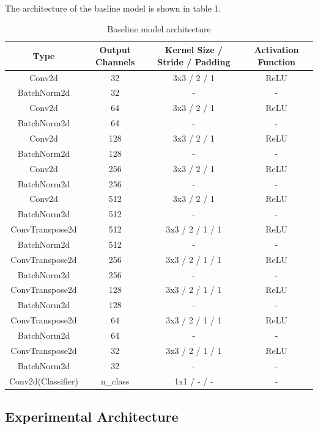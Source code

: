 \documentclass{article}
\begin{document}
The architecture of the basline model is shown in table 1.
\begin{table}[h!]
\caption{Baseline model architecture}
\label{tab:baseline_model_architecture}
\centering
\begin{tabular}{cccc}
  \toprule
  \textbf{Type} & \textbf{Output Channels} & \textbf{Kernel Size / Stride / Padding} & \textbf{Activation Function} \\ 
  \midrule
  Conv2d & 32 & 3x3 / 2 / 1 & ReLU \\ 
  BatchNorm2d & 32 & - & - \\ 
  Conv2d & 64 & 3x3 / 2 / 1 & ReLU \\ 
  BatchNorm2d & 64 & - & - \\ 
  Conv2d & 128 & 3x3 / 2 / 1 & ReLU \\ 
  BatchNorm2d & 128 & - & - \\ 
  Conv2d & 256 & 3x3 / 2 / 1 & ReLU \\ 
  BatchNorm2d & 256 & - & - \\ 
  Conv2d & 512 & 3x3 / 2 / 1 & ReLU \\ 
  BatchNorm2d & 512 & - & - \\ 
  ConvTranspose2d & 512 & 3x3 / 2 / 1 / 1 & ReLU \\ 
  BatchNorm2d & 512 & - & - \\ 
  ConvTranspose2d & 256 & 3x3 / 2 / 1 / 1 & ReLU \\ 
  BatchNorm2d & 256 & - & - \\ 
  ConvTranspose2d & 128 & 3x3 / 2 / 1 / 1 & ReLU \\ 
  BatchNorm2d & 128 & - & - \\ 
  ConvTranspose2d & 64 & 3x3 / 2 / 1 / 1 & ReLU \\ 
  BatchNorm2d & 64 & - & - \\ 
  ConvTranspose2d & 32 & 3x3 / 2 / 1 / 1 & ReLU \\ 
  BatchNorm2d & 32 & - & - \\ 
  Conv2d(Classifier) & n\_class & 1x1 / - / - & - \\ 
  \bottomrule
\end{tabular}
\end{table}

\subsection{Experimental Architecture}
\end{document}
